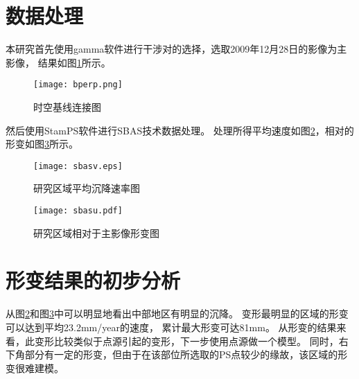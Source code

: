 \section{数据处理}

本研究首先使用gamma软件进行干涉对的选择，选取2009年12月28日的影像为主影像，
结果如图\ref{fig:bprep}所示。
\begin{figure}[htb]
    \centering
    \texttt{[image: bperp.png]}
    \caption{时空基线连接图}
    \label{fig:bprep}
\end{figure}
然后使用StamPS软件进行SBAS技术数据处理。
处理所得平均速度如图\ref{fig:sbasv}，相对的形变如图\ref{fig:sbasu}所示。
\begin{figure}[htb]
    \centering
    \texttt{[image: sbasv.eps]}
    \caption{研究区域平均沉降速率图}
    \label{fig:sbasv}
\end{figure}
\begin{figure}[htb]
    \centering
    \texttt{[image: sbasu.pdf]}
    \caption{研究区域相对于主影像形变图}
    \label{fig:sbasu}
\end{figure}

\section{形变结果的初步分析}
从图\ref{fig:sbasv}和图\ref{fig:sbasu}中可以明显地看出中部地区有明显的沉降。
变形最明显的区域的形变可以达到平均23.2mm/year的速度，
累计最大形变可达81mm。
从形变的结果来看，此变形比较类似于点源引起的变形，下一步使用点源做一个模型。
同时，右下角部分有一定的形变，但由于在该部位所选取的PS点较少的缘故，该区域的形变很难建模。
